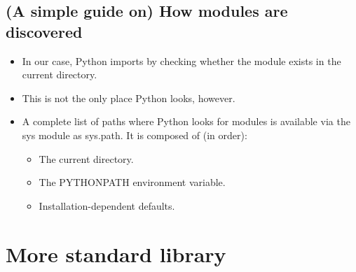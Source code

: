 \documentclass[aspectratio=1610,slidestop]{beamer}
\begin{document}
\subsection{(A simple guide on) How modules are discovered}
\begin{pframe}
 \begin{itemize}
  \item In our case, Python imports by checking whether the module exists in
  the current directory.
  \item This is not the only place Python looks, however.
  \item A complete list of paths where Python looks for modules is available
  via the sys module as sys.path. It is composed of (in order):
  \begin{itemize}
   \item The current directory.
   \item The PYTHONPATH environment variable.
   \item Installation-dependent defaults.
  \end{itemize}
 \end{itemize}
\end{pframe}


\section{More standard library}
\end{document}
